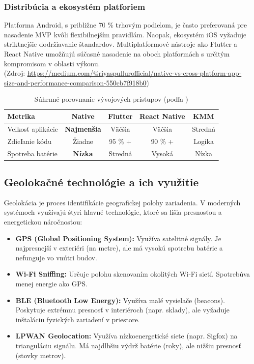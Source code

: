\subsubsection{Distribúcia a ekosystém platforiem}
Platforma Android, s približne 70 \% trhovým podielom, je často preferovaná pre nasadenie MVP kvôli flexibilnejším pravidlám. Naopak, ekosystém iOS vyžaduje striktnejšie dodržiavanie štandardov. Multiplatformové nástroje ako Flutter a React Native umožňujú súčasné nasadenie na oboch platformách s určitým kompromisom v oblasti výkonu.
\\ (Zdroj: \url{https://medium.com/@riyaspullurofficial/native-vs-cross-platform-app-size-and-performance-comparison-550cb7f918b0})


\begin{table}[h!]
\centering
\caption{Súhrnné porovnanie vývojových prístupov (podľa \cite{pullur_medium_2025})}
\label{tab:final_comparison}
\begin{tabular}{|l|c|c|c|c|}
\hline
\textbf{Metrika} & \textbf{Native} & \textbf{Flutter} & \textbf{React Native} & \textbf{KMM} \\ \hline
Veľkosť aplikácie & \textbf{Najmenšia} & Väčšia & Väčšia & Stredná \\ \hline
Zdieľanie kódu & Žiadne & 95 \% + & 90 \% + & Logika \\ \hline
Spotreba batérie & \textbf{Nízka} & Stredná & Vysoká & Nízka \\ \hline
\end{tabular}
\end{table}
  \fi

\subsection{Geolokačné technológie a ich využitie}
Geolokácia je proces identifikácie geografickej polohy zariadenia. V moderných systémoch využívajú štyri hlavné technológie, ktoré sa líšia presnosťou a energetickou náročnosťou:

\begin{itemize}[noitemsep]
    \item \textbf{GPS (Global Positioning System):} Využíva satelitné signály. Je najpresnejší v exteriéri (na metre), ale má vysokú spotrebu batérie a nefunguje vo vnútri budov.
    \item \textbf{Wi-Fi Sniffing:} Určuje polohu skenovaním okolitých Wi-Fi sietí. Spotrebúva menej energie ako GPS.
    \item \textbf{BLE (Bluetooth Low Energy):} Využíva malé vysielače (beacons). Poskytuje extrémnu presnosť v interiéroch (napr. sklady), ale vyžaduje inštaláciu fyzických zariadení v priestore.
    \item \textbf{LPWAN Geolocation:} Využíva nízkoenergetické siete (napr. Sigfox) na trianguláciu signálu. Má najdlhšiu výdrž batérie (roky), ale nižšiu presnosť (stovky metrov).
\end{itemize}\cite{sensolus_geoloc}

